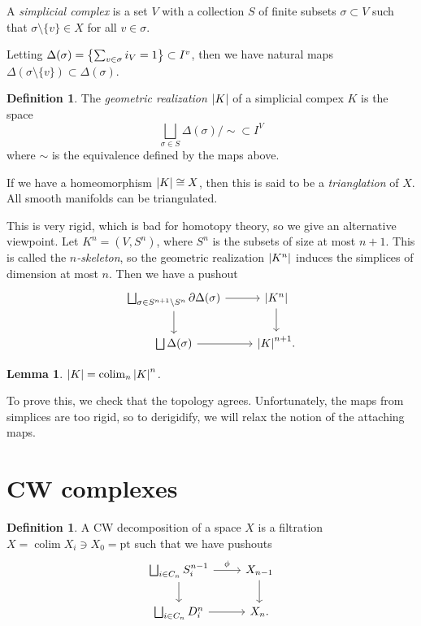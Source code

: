 \documentclass[leqno, openany]{memoir}
\newtheorem{lem}[thm]{Lemma}
\theoremstyle{definition}
\newtheorem{defn}[thm]{Definition}
\theoremstyle{remark}
\theoremstyle{plain}
\theoremstyle{definition}
\theoremstyle{remark}
\newcommand{\mr}[1]{\mathrm{#1}}
\begin{document}
A \textit{simplicial complex} is a set $V$ with a collection $S$ of finite subsets $\sigma \subset V$ such that $\sigma \setminus \{v \} \in X$ for all $v \in \sigma$.

Letting $\Delta(\sigma) = \qty{\sum_{v \in \sigma} i_V = 1} \subset I^{v}$, then we have natural maps $\Delta(\sigma \setminus \{v\}) \subset \Delta(\sigma)$.

\begin{defn}
    The \textit{geometric realization} $\abs{K}$ of a simplicial compex $K$ is the space
    \[ \bigsqcup_{\sigma \in S} \Delta(\sigma) / \sim \subset I^V \]
    where $\sim$ is the equivalence defined by the maps above.
\end{defn}

If we have a homeomorphism $\abs{K} \cong X$, then this is said to be a \textit{trianglation} of $X$. All smooth manifolds can be triangulated.

This is very rigid, which is bad for homotopy theory, so we give an alternative viewpoint. Let $K^n = (V, S^n)$, where $S^n$ is the subsets of size at most $n+1$. This is called the \textit{$n$-skeleton}, so the geometric realization $\abs{K^n}$ induces the simplices of dimension at most $n$. Then we have a pushout
\begin{equation*}
\begin{tikzcd}
    \bigsqcup_{\sigma \in S^{n+1} \setminus S^n} \partial \Delta(\sigma) \arrow{r} \arrow{d} & \abs{K^n} \arrow{d} \\
    \bigsqcup \Delta(\sigma) \arrow{r} & \abs{K}^{n+1}.
\end{tikzcd}
\end{equation*}

\begin{lem}
    $\abs{K} = \operatorname{colim}_n \abs{K}^n$.
\end{lem}
To prove this, we check that the topology agrees. Unfortunately, the maps from simplices are too rigid, so to derigidify, we will relax the notion of the attaching maps.

\section{CW complexes}%
\label{sec:cw_complexes}

\begin{defn}
    A CW decomposition of a space $X$ is a filtration $X = \operatorname{colim} X_i \ni X_0 = \mr{pt}$ such that we have pushouts
    \begin{equation*}
    \begin{tikzcd}
        \bigsqcup_{i \in C_n} S_i^{n-1} \arrow{r}{\phi} \arrow{d} & X_{n-1} \arrow{d} \\
        \bigsqcup_{i \in C_n} D_i^n \arrow{r} & X_n.
    \end{tikzcd}
    \end{equation*}    
\end{defn}
\end{document}
